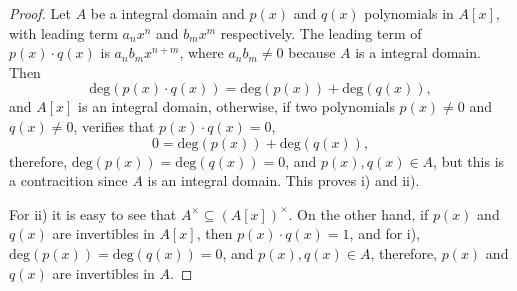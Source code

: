 \documentclass[11pt,a4paper]{article}
\begin{document}
\begin{proof}
    Let $A$ be a integral domain and $p(x)$ and $q(x)$ polynomials in $A[x],$ with leading term $a_nx^n$ and $b_mx^m$ respectively. The leading term of $p(x)\cdot q(x)$ is $a_nb_mx^{n+m}$, where $a_nb_m\neq 0$ because $A$ is a integral domain. Then 
    \[\text{deg}(p(x)\cdot q(x)) = \text{deg}(p(x))+ \text{deg}(q(x)),\]
    and $A[x]$ is an integral domain, otherwise, if two polynomials $p(x)\neq 0$ and $q(x)\neq 0$, verifies that $p(x)\cdot q(x)=0$,
    \[0 = \text{deg}(p(x))+ \text{deg}(q(x)),\]
    therefore, $\text{deg}(p(x))= \text{deg}(q(x))=0$, and $p(x),q(x)\in A$, but this is a contracition since $A$ is an integral domain. This proves i) and ii). 
    
   For ii) it is easy to see that $A^{\times}\subseteq (A[x])^{\times}.$ On the other hand, if $p(x)$ and $q(x)$ are invertibles in $A[x]$, then $p(x)\cdot q(x)=1$, and for i),  $\text{deg}(p(x))= \text{deg}(q(x))=0$, and $p(x),q(x)\in A$, therefore, $p(x)$ and $q(x)$ are invertibles in $A$.
\end{proof}




\end{document}

